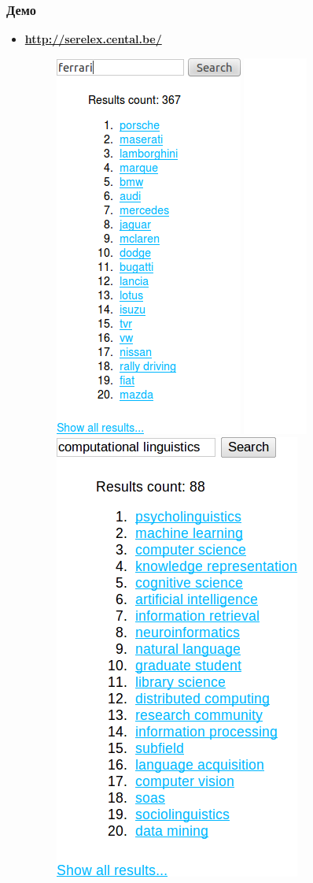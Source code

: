 \documentclass{beamer}
\begin{document}
\begin{frame}
\frametitle{Демо}

\begin{itemize}
  \item {\bf \url{http://serelex.cental.be/} }
  
\begin{figure}	
	\centering
		\includegraphics[height=0.6\textwidth]{figures/serelex}
		\includegraphics[height=0.5\textwidth]{figures/spacer}
		\includegraphics[height=0.6\textwidth]{figures/serelex-2}
		\end{figure}
\end{itemize}
\end{frame}
\end{document}
